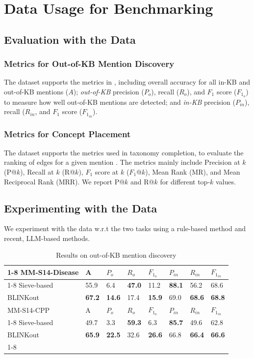 \documentclass[sigconf]{acmart}
\begin{document}
\section{Data Usage for Benchmarking}

\subsection{Evaluation with the Data}
\subsubsection*{Metrics for Out-of-KB Mention Discovery} The dataset supports the metrics in \cite{dong2023NIL}, including overall accuracy for all in-KB and out-of-KB mentions ($A$); \textit{out-of-KB} precision ($P_o$), recall ($R_o$), and $F_1$ score ($F_{1_o}$) to measure how well out-of-KB mentions are detected; and \textit{in-KB} precision ($P_{in}$), recall ($R_{in}$, and $F_1$ score ($F_{1_{in}}$).

\subsubsection*{Metrics for Concept Placement} The dataset supports the metrics used in taxonomy completion, to evaluate the ranking of edges for a given mention \cite{zhang2021TMN,Jiang2022taxoenrich,Shen2020TaxoExpan}. The metrics mainly include Precision at $k$ (P@$k$), Recall at $k$ (R@$k$), $F_1$ score at $k$ ($F_1$@$k$), Mean Rank (MR), and Mean Reciprocal Rank (MRR). We report P@$k$ and R@$k$ for different top-$k$ values. 

\subsection{Experimenting with the Data}
We experiment with the data w.r.t the two tasks using a rule-based method and recent, LLM-based methods.

\begin{table}
\small
\caption{Results on out-of-KB mention discovery}\label{out-of-KB-res}
\begin{tabular}{l|l|lll|lll}
\cline{1-8}
MM-S14-Disease & A & $P_o$ & $R_o$ & $F_{1_o}$ & $P_{in}$ & $R_{in}$ & $F_{1_{in}}$    \\
\cline{1-8}
Sieve-based & 55.9 & 6.4      & \textbf{47.0}  & 11.2 & \textbf{88.1} & 56.2 & 68.6  \\
BLINKout       & \textbf{67.2} & \textbf{14.6}      & 17.4     & \textbf{15.9} & 69.0 & \textbf{68.6} & \textbf{68.8}  \\
\hline\hline
MM-S14-CPP     & A & $P_o$ & $R_o$ & $F_{1_o}$ & $P_{in}$ & $R_{in}$ & $F_{1_{in}}$    \\
\cline{1-8}
Sieve-based & 49.7 & 3.3      & \textbf{59.3}   & 6.3 & \textbf{85.7} & 49.6 & 62.8  \\
BLINKout       & \textbf{65.9} & \textbf{22.5}          & 32.6      & \textbf{26.6} & 66.8 & \textbf{66.4} & \textbf{66.6}     \\
\cline{1-8}
\end{tabular}
\end{table}
\end{document}
